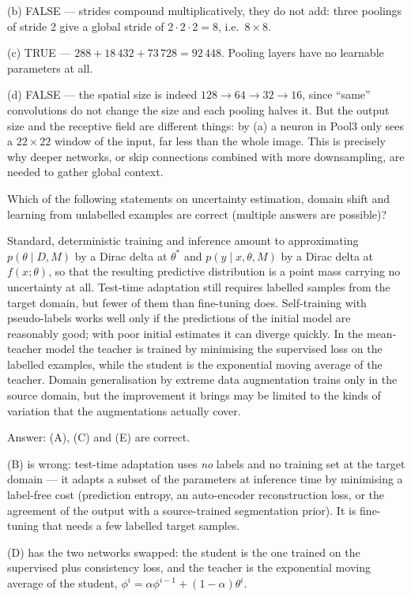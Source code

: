 \documentclass[11pt]{exam}
\begin{document}
\begin{questions}
\begin{solution}
  (b) FALSE --- strides compound multiplicatively, they do not add: three poolings of stride 2
  give a global stride of $2 \cdot 2 \cdot 2 = 8$, i.e.\ $8 \times 8$.

  (c) TRUE --- $288 + 18\,432 + 73\,728 = 92\,448$. Pooling layers have no learnable parameters
  at all.

  (d) FALSE --- the spatial size is indeed $128 \to 64 \to 32 \to 16$, since ``same'' convolutions
  do not change the size and each pooling halves it. But the output size and the receptive field
  are different things: by (a) a neuron in Pool3 only sees a $22 \times 22$ window of the input,
  far less than the whole image. This is precisely why deeper networks, or skip connections
  combined with more downsampling, are needed to gather global context.
\end{solution}

\question
Which of the following statements on uncertainty estimation, domain shift and learning from
unlabelled examples are correct (multiple answers are possible)?

\begin{choices}
  \choice Standard, deterministic training and inference amount to approximating
  $p(\theta \mid D, M)$ by a Dirac delta at $\theta^*$ and $p(y \mid x, \theta, M)$ by a Dirac
  delta at $f(x;\theta)$, so that the resulting predictive distribution is a point mass carrying
  no uncertainty at all.
  \choice Test-time adaptation still requires labelled samples from the target domain, but fewer
  of them than fine-tuning does.
  \choice Self-training with pseudo-labels works well only if the predictions of the initial
  model are reasonably good; with poor initial estimates it can diverge quickly.
  \choice In the mean-teacher model the teacher is trained by minimising the supervised loss on
  the labelled examples, while the student is the exponential moving average of the teacher.
  \choice Domain generalisation by extreme data augmentation trains only in the source domain,
  but the improvement it brings may be limited to the kinds of variation that the augmentations
  actually cover.
\end{choices}

\begin{solution}
  Answer: (A), (C) and (E) are correct.

  (B) is wrong: test-time adaptation uses \emph{no} labels and no training set at the target
  domain --- it adapts a subset of the parameters at inference time by minimising a label-free
  cost (prediction entropy, an auto-encoder reconstruction loss, or the agreement of the output
  with a source-trained segmentation prior). It is fine-tuning that needs a few labelled target
  samples.

  (D) has the two networks swapped: the student is the one trained on the supervised plus
  consistency loss, and the teacher is the exponential moving average of the student,
  $\phi^i = \alpha \phi^{i-1} + (1-\alpha)\theta^i$.
\end{solution}

\end{questions}
\end{document}
